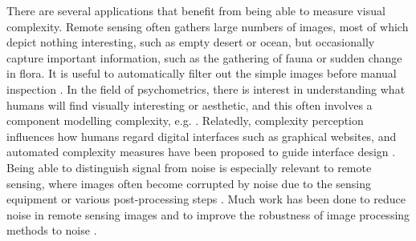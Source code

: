 \documentclass[a4paper,fleqn]{cas-sc}
\theoremstyle{remark}
\begin{document}
There are several applications that benefit from being able to measure visual complexity. Remote sensing often gathers large numbers of images, most of which depict nothing interesting, such as empty desert or ocean, but occasionally capture important information, such as the gathering of fauna or sudden change in flora. It is useful to automatically filter out the simple images before manual inspection \citep{falconer2004fractal,sun2006fractal,yang2000analysis}. In the field of psychometrics, there is interest in understanding what humans will find visually interesting or aesthetic, and this often involves a component modelling complexity, e.g. \citep{forsythe2008confounds, carballal2020comparison}. Relatedly, complexity perception influences how humans regard digital interfaces such as graphical websites, and automated complexity measures have been proposed to guide interface design \citep{stickel2010xaos}. Being able to distinguish signal from noise is especially relevant to remote sensing, where images often become corrupted by noise due to the sensing equipment or various post-processing steps
\citep{chioukh2014noise,narayanan2003effects,landgrebe1986noise}. Much work has been done to reduce noise in remote sensing images \citep{chang2016remote,rasti2018noise} and to improve the robustness of image processing methods to noise \citep{huang2020efficient,duan2019noise}.
\end{document}
